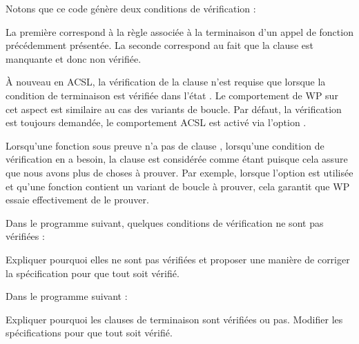 

Notons que ce code génère deux conditions de vérification :




La première correspond à la règle associée à la terminaison d'un appel de
fonction précédemment présentée. La seconde correspond au fait que la clause
 est manquante et donc non vérifiée.


À nouveau en ACSL, la vérification de la clause  n'est
requise que lorsque la condition de terminaison est vérifiée dans l'état
. Le comportement de WP sur cet aspect est similaire au cas
des variants de boucle. Par défaut, la vérification est toujours demandée, le
comportement ACSL est activé via l'option
.




\begin{Information}
  Lorsqu'une fonction sous preuve n'a pas de clause ,
  lorsqu'une condition de vérification en a besoin, la clause est considérée
  comme étant  puisque cela assure que nous
  avons plus de choses à prouver. Par exemple, lorsque l'option
   est utilisée et qu'une fonction
  contient un variant de boucle à prouver, cela garantit que WP essaie
  effectivement de le prouver.
\end{Information}






Dans le programme suivant, quelques conditions de vérification ne sont pas
vérifiées :




Expliquer pourquoi elles ne sont pas vérifiées et proposer une manière de
corriger la spécification pour que tout soit vérifié.




Dans le programme suivant :




Expliquer pourquoi les clauses de terminaison sont vérifiées ou pas. Modifier
les spécifications pour que tout soit vérifié.


